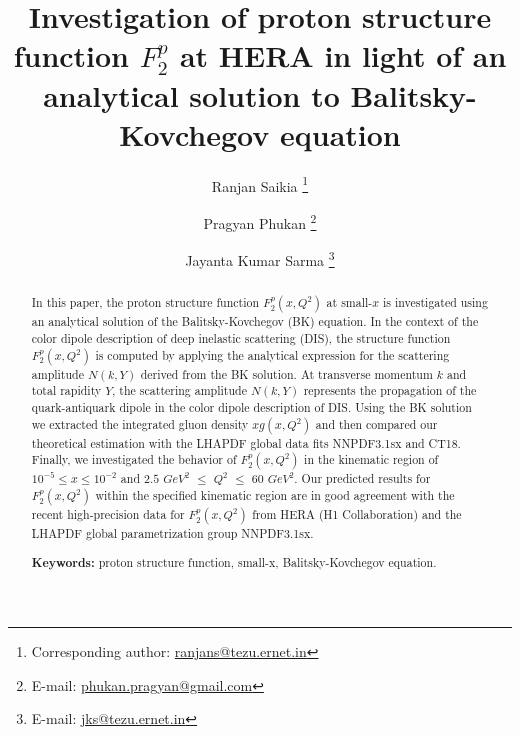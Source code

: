 \documentclass[12pt]{article}
\date{}
\title{\large\textbf{Investigation of proton structure function $F_2 ^p$ at HERA in light of an analytical solution to Balitsky-Kovchegov equation} }
\author[1] {Ranjan Saikia 
\footnote{Corresponding author:  \href{mailto:ranjans@tezu.ernet.in}{ ranjans@tezu.ernet.in}}}
\author[2] {Pragyan Phukan \footnote{E-mail: \href{mailto:phukan.pragyan@gmail.com}{ phukan.pragyan@gmail.com}}}
\author[1] {Jayanta Kumar Sarma \footnote{E-mail: \href{mailto:jks@tezu.ernet.in}{ jks@tezu.ernet.in}}}
\affil[1]{\small \emph{HEP laboratory, Department of Physics, Tezpur University, Tezpur, Assam-784028, India}}
\affil[2]{\small \emph{Department of Physics, Moran College, Moranhat, Assam-785670, India}}
\begin{document}
\maketitle

\begin{abstract}
  In this paper, the proton structure function $F_2 ^p (x,Q^2)$ at small-$x$ is investigated using an analytical solution of the Balitsky-Kovchegov (BK) equation. In the context of the color dipole description of deep inelastic scattering (DIS), the structure function $F_2 ^p (x,Q^2)$ is computed by applying the analytical expression for the scattering amplitude $N(k,Y)$ derived from the BK solution. At transverse momentum $k$ and total rapidity $Y$, the scattering amplitude $N(k,Y)$ represents the propagation of the quark-antiquark dipole in the color dipole description of DIS. Using the BK solution we extracted the integrated gluon density $xg(x,Q^2)$ and then compared our theoretical estimation with the LHAPDF global data fits NNPDF3.1sx and CT18. Finally, we investigated the behavior of $F_2 ^p (x,Q^2)$ in the kinematic region of $10^{-5} \leq x \leq 10^{-2}$ and $2.5$ $GeV^{2}$ $\leq$ $Q^2$ $\leq$ $60$ $GeV^{2}$. Our predicted results for $F_2 ^p (x,Q^2)$ within the specified kinematic region are in good agreement with the recent high-precision data for $F_2 ^p (x,Q^2)$ from HERA (H1 Collaboration) and the LHAPDF global parametrization group NNPDF3.1sx. 
	
	\vspace{1cm}
	
    {\bf Keywords:} proton structure function, small-x, Balitsky-Kovchegov equation.
\end{abstract}
	
\thispagestyle{empty}

\clearpage
\end{document}

